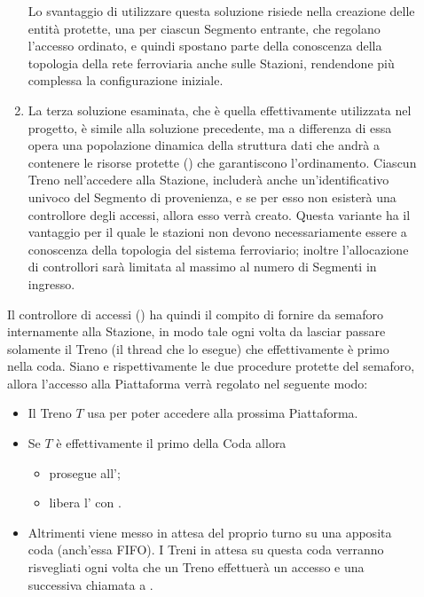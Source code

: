 \begin{description}
\begin{enumerate}
			Lo svantaggio di utilizzare questa soluzione risiede nella creazione delle entità protette, una per ciascun Segmento entrante, che regolano l'accesso ordinato, e quindi spostano parte della conoscenza della topologia della rete ferroviaria anche sulle Stazioni, rendendone più complessa la configurazione iniziale.
			
			\item La terza soluzione esaminata, che è quella effettivamente utilizzata nel progetto, è simile alla soluzione precedente, ma a differenza di essa opera una popolazione dinamica della struttura dati che andrà a contenere le risorse protette () che garantiscono l'ordinamento. Ciascun Treno nell'accedere alla Stazione, includerà anche un'identificativo univoco del Segmento di provenienza, e se per esso non esisterà una controllore degli accessi, allora esso verrà creato. Questa variante ha il vantaggio per il quale le stazioni non devono necessariamente essere a conoscenza della topologia del sistema ferroviario; inoltre l'allocazione di controllori sarà limitata al massimo al numero di Segmenti in ingresso.
		\end{enumerate} 
		
		Il controllore di accessi () ha quindi il compito di fornire da semaforo internamente alla Stazione, in modo tale ogni volta da lasciar passare solamente il Treno (il thread che lo esegue) che effettivamente è primo nella coda. Siano  e  rispettivamente le due procedure protette del semaforo, allora l'accesso alla Piattaforma verrà regolato nel seguente modo:
			\begin{itemize}
				\item Il Treno $T$ usa  per poter accedere alla prossima Piattaforma.
				\item Se $T$ è effettivamente il primo della Coda allora 
					\begin{itemize}
						\item prosegue all';
						\item libera l' con . 
					\end {itemize}
				\item Altrimenti viene messo in attesa del proprio turno su una apposita coda (anch'essa FIFO). I Treni in attesa su questa coda verranno risvegliati ogni volta che un Treno effettuerà un accesso e una successiva chiamata a .
			\end{itemize}
		

\end{description}
